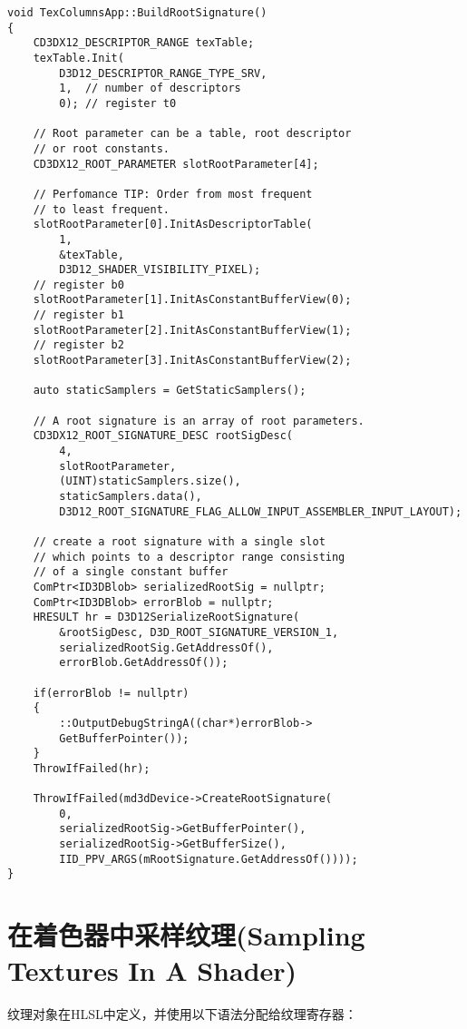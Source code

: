 \begin{lstlisting}
void TexColumnsApp::BuildRootSignature()
{
    CD3DX12_DESCRIPTOR_RANGE texTable;
    texTable.Init(
        D3D12_DESCRIPTOR_RANGE_TYPE_SRV, 
        1,  // number of descriptors
        0); // register t0

    // Root parameter can be a table, root descriptor 
    // or root constants.
    CD3DX12_ROOT_PARAMETER slotRootParameter[4];

    // Perfomance TIP: Order from most frequent 
    // to least frequent.
    slotRootParameter[0].InitAsDescriptorTable(
        1, 
        &texTable, 
        D3D12_SHADER_VISIBILITY_PIXEL);
    // register b0
    slotRootParameter[1].InitAsConstantBufferView(0);
    // register b1
    slotRootParameter[2].InitAsConstantBufferView(1);
    // register b2
    slotRootParameter[3].InitAsConstantBufferView(2);

    auto staticSamplers = GetStaticSamplers();

    // A root signature is an array of root parameters.
    CD3DX12_ROOT_SIGNATURE_DESC rootSigDesc(
        4, 
        slotRootParameter,
        (UINT)staticSamplers.size(), 
        staticSamplers.data(),
        D3D12_ROOT_SIGNATURE_FLAG_ALLOW_INPUT_ASSEMBLER_INPUT_LAYOUT);

    // create a root signature with a single slot 
    // which points to a descriptor range consisting 
    // of a single constant buffer
    ComPtr<ID3DBlob> serializedRootSig = nullptr;
    ComPtr<ID3DBlob> errorBlob = nullptr;
    HRESULT hr = D3D12SerializeRootSignature(
        &rootSigDesc, D3D_ROOT_SIGNATURE_VERSION_1,
        serializedRootSig.GetAddressOf(), 
        errorBlob.GetAddressOf());

    if(errorBlob != nullptr)
    {
        ::OutputDebugStringA((char*)errorBlob->
        GetBufferPointer());
    }
    ThrowIfFailed(hr);

    ThrowIfFailed(md3dDevice->CreateRootSignature(
        0,
        serializedRootSig->GetBufferPointer(),
        serializedRootSig->GetBufferSize(),
        IID_PPV_ARGS(mRootSignature.GetAddressOf())));
}
\end{lstlisting}

\section{在着色器中采样纹理(Sampling Textures In A Shader)}
\begin{flushleft}
纹理对象在HLSL中定义，并使用以下语法分配给纹理寄存器：\\
\end{flushleft}

